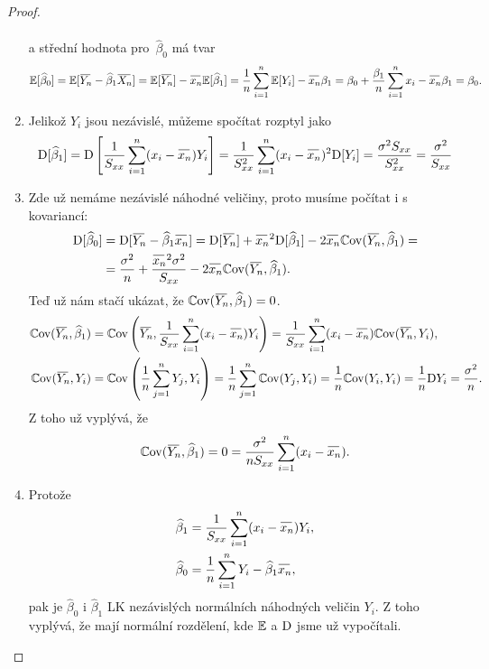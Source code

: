 \begin{theorem}
\begin{proof}
\begin{enumerate}
\begin{equation*}
\begin{aligned}
  		    \end{aligned}
  		\end{equation*}
  		a střední hodnota pro~$\widehat{\beta}_0$ má tvar
  		\begin{equation*}
  		\begin{aligned}
  		    \E [\widehat{\beta}_0] = \E [\oyn - \widehat{\beta}_1 \oxn] = \E [\oyn] - \oxnn \E [\widehat{\beta}_1] = \frac{1}{n} \sumin \E [Y_i] - \oxnn \beta_1 = \beta_0 + \frac{\beta_1}{n} \sumin x_i - \oxnn \beta_1 = \beta_0.
  		    \end{aligned}
  		\end{equation*}
  \item 
  Jelikož $Y_i$ jsou nezávislé, můžeme spočítat rozptyl jako
  \begin{equation*}
  			\D [\widehat{\beta}_1] = \D \left[\frac{1}{\Sxx} \sumin (x_i - \oxnn) Y_i \right] = \frac{1}{\Sxx^2} \sumin (x_i - \oxnn)^2 \D [Y_i] = \frac{\sigma^2 \Sxx}{\Sxx^2} = \frac{\sigma^2}{\Sxx}
  		\end{equation*}
  \item  
  Zde už nemáme nezávislé náhodné veličiny, proto musíme počítat i s kovariancí:
  \begin{equation*}
  \begin{aligned}
 \D [\widehat{\beta}_0] & = \D [\oyn - \widehat{\beta}_1 \oxnn] = \D [\oyn] + \oxnn^2 \D [\widehat{\beta}_1] - 2 \oxnn \Cov(\oyn, \widehat{\beta}_1) = \\
  	& = \frac{\sigma^2}{n} + \frac{\oxnn^2 \sigma^2 }{\Sxx} - 2 \oxnn \Cov(\oyn,  \widehat{\beta}_1). 
  	\end{aligned}
  	\end{equation*}
  	Teď už nám stačí ukázat, že $\Cov(\oyn,  \widehat{\beta}_1) = 0$.
  	\begin{equation*}
  	\begin{aligned}
\Cov(\oyn,  \widehat{\beta}_1) & = \Cov \left(\oyn, \frac{1}{\Sxx} \sumin (x_i - \oxnn) Y_i \right) = \frac{1}{\Sxx} \sumin (x_i - \oxnn) \Cov (\oyn, Y_i),  \\
\Cov (\oyn, Y_i) & = \Cov \left(\frac{1}{n} \sumjn Y_j, Y_i\right) = \frac{1}{n} \sumjn \Cov (Y_j, Y_i) = \frac{1}{n} \Cov (Y_i, Y_i) = 	\frac{1}{n} \D Y_i = \frac{\sigma^2}{n}.	
  			\end{aligned}
  		\end{equation*}
  		Z toho už vyplývá, že $$\Cov(\oyn,  \widehat{\beta}_1) = 0 = \frac{\sigma^2}{n \Sxx} \sumin (x_i - \oxnn).$$
  \item Protože
  \begin{align*}
  \widehat{\beta}_1& = \frac{1}{\Sxx}\sumin (x_i-\oxnn)Y_i,\\\widehat{\beta}_0& = \frac{1}{n}\sumin Y_i - \widehat{\beta}_1 \oxnn,
  \end{align*}
  pak je $\widehat{\beta}_0$ i $\widehat{\beta}_1$ LK nezávislých normálních náhodných veličin $Y_i$. Z toho vyplývá, že mají normální rozdělení, kde $\mathbb{E}$ a $\mathrm{D}$ jsme už vypočítali.
\end{enumerate}
\end{proof}
\end{theorem}



